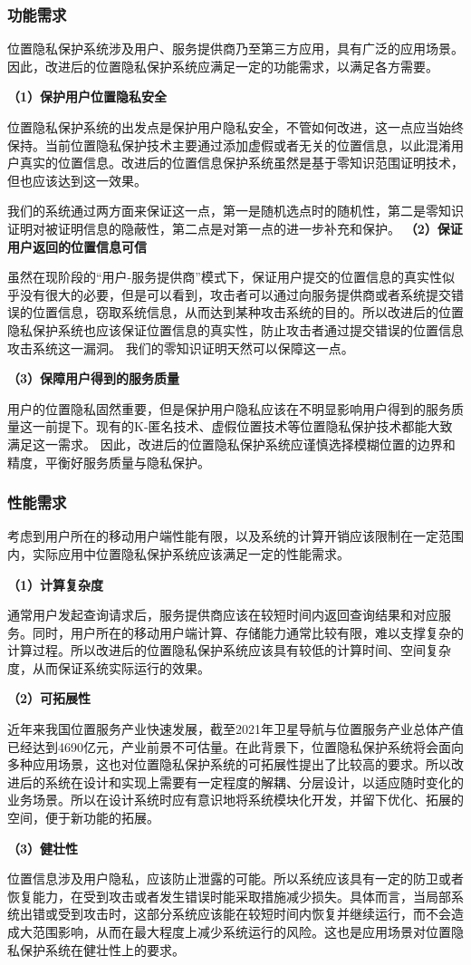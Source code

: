 \documentclass[zihao=-4]{ctexart}
\begin{document}
\subsubsection{功能需求}
位置隐私保护系统涉及用户、服务提供商乃至第三方应用，具有广泛的应用场景。因此，改进后的位置隐私保护系统应满足一定的功能需求，以满足各方需要。
\par 
\textbf{（1）保护用户位置隐私安全}
\par 
位置隐私保护系统的出发点是保护用户隐私安全，不管如何改进，这一点应当始终保持。当前位置隐私保护技术主要通过添加虚假或者无关的位置信息，以此混淆用户真实的位置信息。改进后的位置信息保护系统虽然是基于零知识范围证明技术，但也应该达到这一效果。
\par 
我们的系统通过两方面来保证这一点，第一是随机选点时的随机性，第二是零知识证明对被证明信息的隐蔽性，第二点是对第一点的进一步补充和保护。
\textbf{（2）保证用户返回的位置信息可信}
\par 
虽然在现阶段的“用户-服务提供商”模式下，保证用户提交的位置信息的真实性似乎没有很大的必要，但是可以看到，攻击者可以通过向服务提供商或者系统提交错误的位置信息，窃取系统信息，从而达到某种攻击系统的目的。所以改进后的位置隐私保护系统也应该保证位置信息的真实性，防止攻击者通过提交错误的位置信息攻击系统这一漏洞。
我们的零知识证明天然可以保障这一点。
\par 
\textbf{（3）保障用户得到的服务质量}
\par 
用户的位置隐私固然重要，但是保护用户隐私应该在不明显影响用户得到的服务质量这一前提下。现有的K-匿名技术、虚假位置技术等位置隐私保护技术都能大致满足这一需求。
因此，改进后的位置隐私保护系统应谨慎选择模糊位置的边界和精度，平衡好服务质量与隐私保护。

\subsubsection{性能需求}
考虑到用户所在的移动用户端性能有限，以及系统的计算开销应该限制在一定范围内，实际应用中位置隐私保护系统应该满足一定的性能需求。
\par 
\textbf{（1）计算复杂度}
\par 
通常用户发起查询请求后，服务提供商应该在较短时间内返回查询结果和对应服务。同时，用户所在的移动用户端计算、存储能力通常比较有限，难以支撑复杂的计算过程。所以改进后的位置隐私保护系统应该具有较低的计算时间、空间复杂度，从而保证系统实际运行的效果。
\par 
\textbf{（2）可拓展性}
\par 
近年来我国位置服务产业快速发展，截至2021年卫星导航与位置服务产业总体产值已经达到4690亿元\cite{czh_5.1}，产业前景不可估量。在此背景下，位置隐私保护系统将会面向多种应用场景，这也对位置隐私保护系统的可拓展性提出了比较高的要求。所以改进后的系统在设计和实现上需要有一定程度的解耦、分层设计，以适应随时变化的业务场景。所以在设计系统时应有意识地将系统模块化开发，并留下优化、拓展的空间，便于新功能的拓展。
\par 
\textbf{（3）健壮性}
\par 
位置信息涉及用户隐私，应该防止泄露的可能。所以系统应该具有一定的防卫或者恢复能力，在受到攻击或者发生错误时能采取措施减少损失。具体而言，当局部系统出错或受到攻击时，这部分系统应该能在较短时间内恢复并继续运行，而不会造成大范围影响，从而在最大程度上减少系统运行的风险。这也是应用场景对位置隐私保护系统在健壮性上的要求。
\end{document}
